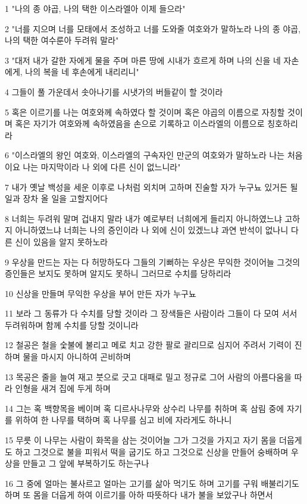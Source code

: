 \par 1 "나의 종 야곱, 나의 택한 이스라엘아 이제 들으라"
\par 2 "너를 지으며 너를 모태에서 조성하고 너를 도와줄 여호와가 말하노라 나의 종 야곱, 나의 택한 여수룬아 두려워 말라"
\par 3 "대저 내가 갈한 자에게 물을 주며 마른 땅에 시내가 흐르게 하며 나의 신을 네 자손에게, 나의 복을 네 후손에게 내리리니"
\par 4 그들이 풀 가운데서 솟아나기를 시냇가의 버들같이 할 것이라
\par 5 혹은 이르기를 나는 여호와께 속하였다 할 것이며 혹은 야곱의 이름으로 자칭할 것이며 혹은 자기가 여호와께 속하였음을 손으로 기록하고 이스라엘의 이름으로 칭호하리라
\par 6 "이스라엘의 왕인 여호와, 이스라엘의 구속자인 만군의 여호와가 말하노라 나는 처음이요 나는 마지막이라 나 외에 다른 신이 없느니라"
\par 7 내가 옛날 백성을 세운 이후로 나처럼 외치며 고하며 진술할 자가 누구뇨 있거든 될 일과 장차 올 일을 고할지어다
\par 8 너희는 두려워 말며 겁내지 말라 내가 예로부터 너희에게 들리지 아니하였느냐 고하지 아니하였느냐 너희는 나의 증인이라 나 외에 신이 있겠느냐 과연 반석이 없나니 다른 신이 있음을 알지 못하노라
\par 9 우상을 만드는 자는 다 허망하도다 그들의 기뻐하는 우상은 무익한 것이어늘 그것의 증인들은 보지도 못하며 알지도 못하니 그러므로 수치를 당하리라
\par 10 신상을 만들며 무익한 우상을 부어 만든 자가 누구뇨
\par 11 보라 그 동류가 다 수치를 당할 것이라 그 장색들은 사람이라 그들이 다 모여 서서 두려워하며 함께 수치를 당할 것이니라
\par 12 철공은 철을 숯불에 불리고 메로 치고 강한 팔로 괄리므로 심지어 주려서 기력이 진하며 물을 마시지 아니하여 곤비하며
\par 13 목공은 줄을 늘여 재고 붓으로 긋고 대패로 밀고 정규로 그어 사람의 아름다움을 따라 인형을 새겨 집에 두게 하며
\par 14 그는 혹 백향목을 베이며 혹 디르사나무와 상수리 나무를 취하며 혹 삼림 중에 자기를 위하여 한 나무를 택하며 혹 나무를 심고 비에 자라게도 하나니
\par 15 무릇 이 나무는 사람이 화목을 삼는 것이어늘 그가 그것을 가지고 자기 몸을 더웁게도 하고 그것으로 불을 피워서 떡을 굽기도 하고 그것으로 신상을 만들어 숭배하며 우상을 만들고 그 앞에 부복하기도 하는구나
\par 16 그 중에 얼마는 불사르고 얼마는 고기를 삶아 먹기도 하며 고기를 구워 배불리기도 하며 또 몸을 더웁게 하여 이르기를 아하 따뜻하다 내가 불을 보았구나 하면서
